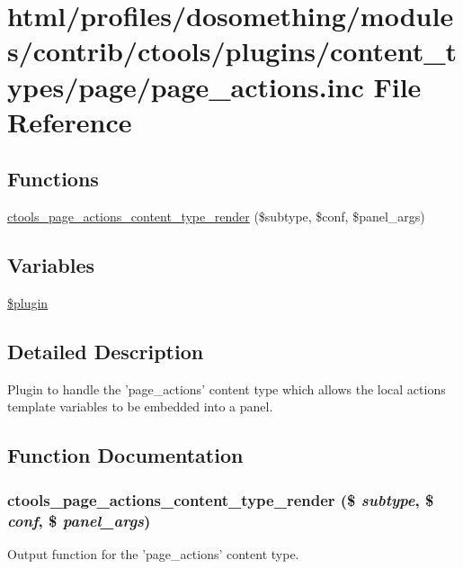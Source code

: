 \hypertarget{page__actions_8inc}{
\section{html/profiles/dosomething/modules/contrib/ctools/plugins/content\_\-types/page/page\_\-actions.inc File Reference}
\label{page__actions_8inc}
}
\subsection*{Functions}
\begin{DoxyCompactItemize}
\item 
\hyperlink{page__actions_8inc_a2aca273a63e6070c74bfa374a5377502}{ctools\_\-page\_\-actions\_\-content\_\-type\_\-render} (\$subtype, \$conf, \$panel\_\-args)
\end{DoxyCompactItemize}
\subsection*{Variables}
\begin{DoxyCompactItemize}
\item 
\hyperlink{page__actions_8inc_ada8a7130088351710bb02ed622d6bf65}{\$plugin}
\end{DoxyCompactItemize}


\subsection{Detailed Description}
Plugin to handle the 'page\_\-actions' content type which allows the local actions template variables to be embedded into a panel. 

\subsection{Function Documentation}
\hypertarget{page__actions_8inc_a2aca273a63e6070c74bfa374a5377502}{
\subsubsection[{ctools\_\-page\_\-actions\_\-content\_\-type\_\-render}]{\setlength{\rightskip}{0pt plus 5cm}ctools\_\-page\_\-actions\_\-content\_\-type\_\-render (\$ {\em subtype}, \/  \$ {\em conf}, \/  \$ {\em panel\_\-args})}}
\label{page__actions_8inc_a2aca273a63e6070c74bfa374a5377502}
Output function for the 'page\_\-actions' content type.

